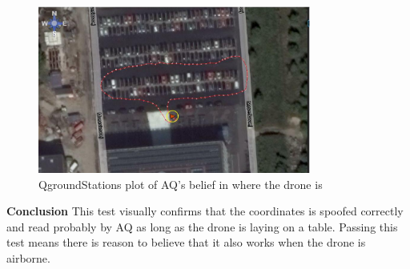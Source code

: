 \begin{figure}[H]
    \center
    \includegraphics[width=0.8\textwidth]{graphics/test_qground_plot.eps}
  \caption{QgroundStations plot of AQ's belief in where the drone is}   \label{fig:test_qground_plot}
\end{figure}

\textbf{Conclusion}
This test visually confirms that the coordinates is spoofed correctly and read probably by AQ as long as the drone is laying on a table. Passing this test means there is reason to believe that it also works when the drone is airborne.

